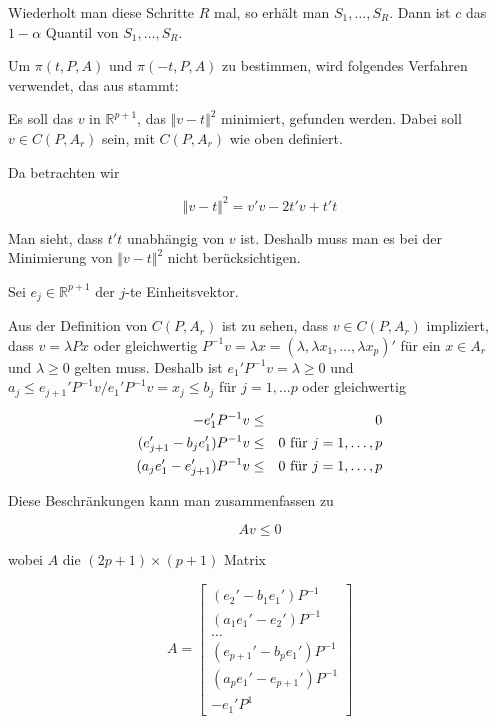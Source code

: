 \documentclass[12pt,a4paper]{article}
\theoremstyle{definition}
\theoremstyle{definition}
\theoremstyle{definition}
\begin{document}
Wiederholt man diese Schritte $R$ mal, so erhält man $S_1, \ldots, S_R$. Dann ist $c$ das $1-\alpha$ Quantil von $S_1, \ldots, S_R$.

Um $\pi(t,P,A)$ und $\pi(-t,P,A)$ zu bestimmen, wird folgendes Verfahren verwendet, das aus \cite[Appendix B]{Liu64} stammt:

Es soll das $v$ in $\mathbb{R}^{p+1}$, das $\Vert v-t \Vert^2$ minimiert, gefunden werden. Dabei soll $v \in C(P,A_{r})$ sein, mit $C(P,A_{r})$ wie oben definiert. 

Da betrachten wir

\begin{equation*}
\Vert v-t \Vert^2 = v'v-2t'v+t't 
\end{equation*}

Man sieht, dass $t't$ unabhängig von $v$ ist. Deshalb muss man es bei der Minimierung von $\Vert v-t \Vert^2$ nicht berücksichtigen.
 
Sei $e_j \in \mathbb{R}^{p+1}$ der $j$-te Einheitsvektor. 

Aus der Definition von $C(P,A_{r})$ ist zu sehen, dass $v \in C(P,A_{r})$ impliziert, dass $v=\lambda P x$ oder gleichwertig $P^{-1}v=\lambda x = (\lambda, \lambda x_1, \ldots , \lambda x_p)'$ für ein $x \in A_{r}$ und $\lambda \geq 0$ gelten muss. Deshalb ist $e_1'P^{-1}v = \lambda \geq 0$ und $a_j \leq e_{j+1}'P^{-1}v/e_1'P^{-1}v = x_j \leq b_j$ für $j = 1, \ldots p$ oder gleichwertig

\begin{eqnarray*}
- e_1' P^{-1} v &\leq & 0 \\
(e_{j+1}' - b_j e_1') P^{-1} v &\leq & 0 \textnormal{ für } j = 1, \ldots, p \\
(a_{j} e_1' - e_{j+1}')P^{-1} v &\leq & 0 \textnormal{ für } j = 1, \ldots, p
\end{eqnarray*}

Diese Beschränkungen kann man zusammenfassen zu 

\begin{equation*}
A v \leq 0
\end{equation*}

wobei $A$ die $(2p+1) \times (p+1)$ Matrix

\[ 
A = 
\begin{bmatrix} (e_2'-b_1 e_1')P^{-1}  \\ 
				(a_1 e_1' - e_2')P^{-1}  \\  
				\ldots						 \\ 
				(e_{p+1}' - b_p e_1') P^{-1}	\\  
				(a_p e_1' - e_{p+1}')P^{-1}  \\
				-e_1'P^{1} 
\end{bmatrix}
\]
\end{document}
